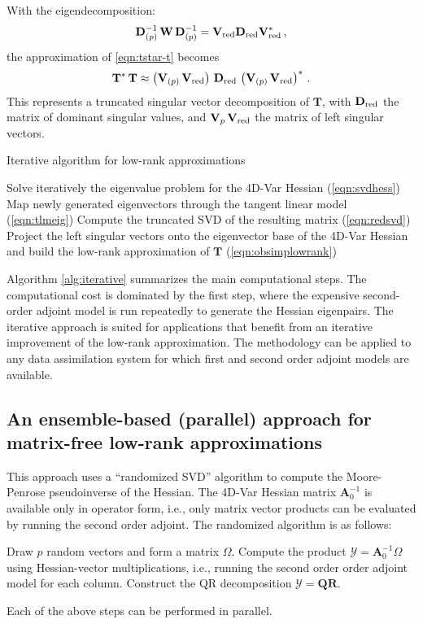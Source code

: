 \documentclass[final,sort&compress]{elsarticle}
\newcommand{\Vm}{\mathbf{V}}
\newcommand{\Dm}{\mathbf{D}}
\newcommand{\T}{\mathbf{T}}
\newcommand{\A}{\mathbf{A}}
\newcommand{\R}{\mathbf{R}}
\newcommand{\Q}{\mathbf{Q}}
\newcommand{\W}{ \mathbf{W} }
\newcommand{\Y}{\mathcal{Y}}
\begin{document}
With the eigendecomposition:
\begin{eqnarray}
 \Dm_{(p)}^{-1}\,\W\,\Dm_{(p)}^{-1} = \Vm_{\rm red} \Dm_{\rm red} \Vm_{\rm red}^*\,, \label{eqn:redsvd}
\end{eqnarray}
the approximation of \eqref{eqn:tstar-t} becomes
\begin{eqnarray}
 \T^*\,\T \approx \left( \Vm_{(p)}\,\Vm_{\rm red} \right) \,\Dm_{\rm red}\,\left( \Vm_{(p)}\,\Vm_{\rm red} \right)^*\,. \label{eqn:obsimplowrank}
\end{eqnarray}
This represents a truncated singular vector decomposition of $\T$, with $\Dm_{\rm red}$ the matrix of dominant singular values, and 
$\Vm_p\,\Vm_{\rm red}$ the matrix of left singular vectors.

\begin{algorithm}[h]
\caption{\label{alg:iterative}Iterative algorithm for low-rank approximations}
\begin{algorithmic}[1]
\State Solve iteratively the eigenvalue problem for the 4D-Var Hessian (\ref{eqn:svdhess})
\State Map newly generated eigenvectors through the tangent linear model (\ref{eqn:tlmeig})
\State Compute the truncated SVD of the resulting matrix (\ref{eqn:redsvd})
\State Project the left singular vectors onto the eigenvector base of the 4D-Var Hessian and build the low-rank approximation of $\T$ (\ref{eqn:obsimplowrank})
\end{algorithmic}
\end{algorithm}

Algorithm \ref{alg:iterative} summarizes the main computational steps. The computational cost is
dominated by the first step, where the expensive second-order adjoint model is run repeatedly to generate the 
Hessian eigenpairs.
The iterative approach is suited for applications that benefit from an iterative improvement of the low-rank approximation. 
The methodology can be applied to any data assimilation system for which first and second order adjoint models are available.

\subsection{An ensemble-based (parallel) approach for matrix-free low-rank approximations}

This approach uses a ``randomized SVD'' algorithm \cite{liberty2007randomized} to compute the Moore-Penrose pseudoinverse \cite{lewis1968pseudoinverss}
of the Hessian. The 4D-Var Hessian matrix $\A_0^{-1}$ is available only in operator form, i.e., only matrix vector products can be evaluated by running the second order adjoint. 
The randomized algorithm is as follows:
\begin{algorithmic}[1]
\State Draw $p$ random vectors and form a matrix $\Omega$.
\State Compute the product $\Y = \A_0^{-1}\Omega$ using Hessian-vector multiplications, i.e., running the second order order adjoint model for each column.
\State Construct the QR decomposition $\Y = \Q\R$.
\end{algorithmic}
Each of the above steps can be performed in parallel.
\end{document}
